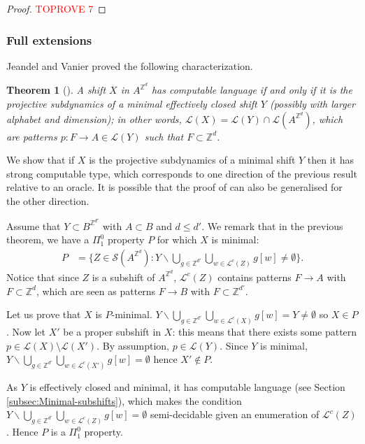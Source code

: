 \documentclass[french,american]{article}
\theoremstyle{plain}
\newtheorem{theorem}{Theorem}[section]
\theoremstyle{definition}
\theoremstyle{remark}
\theoremstyle{plain}
\begin{document}
\begin{proof}\textcolor{red}{TOPROVE 7}\end{proof}

\subsubsection{Full extensions}

Jeandel and Vanier proved the following characterization.
\begin{theorem}[\cite{jeandel2019characterization}]
\foreignlanguage{american}{ A shift $X$ in $A^{\mathbb{Z}^{d}}$
has computable language if and only if it is the \emph{projective subdynamics} of a minimal effectively closed
shift $Y$ (possibly with larger alphabet and dimension); in other words,
$\mathcal{L}(X)=\mathcal{L}(Y)\cap \mathcal L(A^{\mathbb{Z}^{d}})$, which are patterns $p : F\to A \in\mathcal L(Y)$ such that $F\subset \mathbb{Z}^{d}$.}
\end{theorem}

We show that if $X$ is the projective subdynamics of a minimal shift $Y$ then it has strong computable type, which corresponds to one direction of the previous result relative to an oracle. It is possible that the proof of \cite{jeandel2019characterization} can also be generalised for the other direction.

Assume that $Y\subset B^{\mathbb Z^{d'}}$ with $A\subset B$ and $d\leq d'$. We remark that in the previous theorem, we have a $\Pi_{1}^{0}$ property $P$ for which $X$ is minimal:
\begin{align*}
P & =\{Z\in\mathcal{S}(A^{\mathbb{Z}^{d}}):Y\backslash\bigcup_{g\in\mathbb{Z}^{d'}}\bigcup_{w\in\mathcal{L}^{c}(Z)}g[w]\neq\emptyset\}.
\end{align*}
Notice that since $Z$ is a subshift of $A^{\mathbb{Z}^{d}}$, $\mathcal{L}^{c}(Z)$ contains patterns $F\to A$ with $F\subset \mathbb Z^d$, which are seen as patterns $F\to B$ with $F\subset \mathbb Z^{d'}$.

Let us prove that $X$ is $P$-minimal. $Y\backslash\bigcup_{g\in\mathbb{Z}^{d'}}\bigcup_{w\in\mathcal{L}^{c}(X)}g[w]=Y\neq\emptyset$
so $X\in P$. Now let $X'$ be a proper subshift in $X$: this means
that there exists some pattern $p\in \mathcal L(X)\setminus \mathcal L(X')$. By assumption, $p\in\mathcal L(Y)$. Since $Y$ is minimal, $Y\backslash\bigcup_{g\in\mathbb{Z}^{d'}}\bigcup_{w\in\mathcal{L}^{c}(X')}g[w]=\emptyset$
hence $X'\notin P$.

As $Y$ is effectively closed and minimal, it has computable language
(see Section \ref{subsec:Minimal-subshifts}), which makes the condition
$Y\backslash\bigcup_{g\in\mathbb{Z}^{d'}}\bigcup_{w\in\mathcal{L}^{c}(Z)}g[w]=\emptyset$ semi-decidable
given an enumeration of $\mathcal{L}^{c}(Z)$. Hence $P$ is a $\Pi_{1}^{0}$ property.
\end{document}
